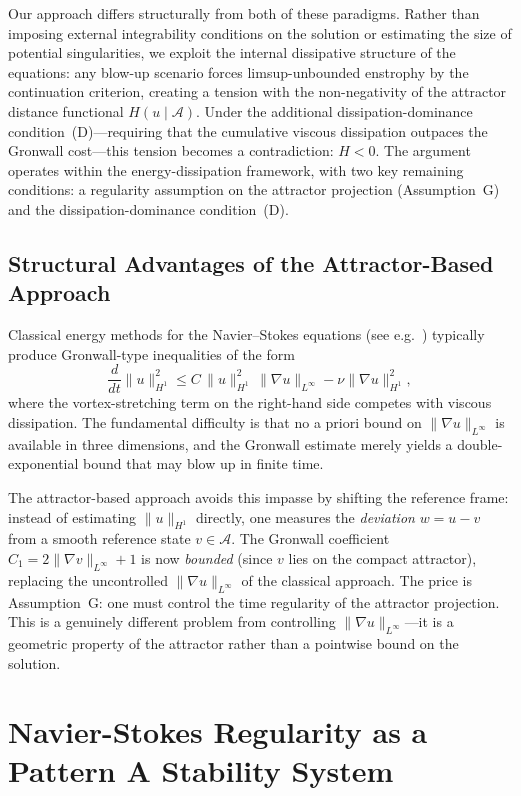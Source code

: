 \documentclass[12pt,a4paper]{article}
\theoremstyle{definition}
\theoremstyle{plain}
\theoremstyle{remark}
\begin{document}
Our approach differs structurally from both of these paradigms. Rather than imposing external integrability conditions on the solution or estimating the size of potential singularities, we exploit the internal dissipative structure of the equations: any blow-up scenario forces limsup-unbounded enstrophy by the continuation criterion, creating a tension with the non-negativity of the attractor distance functional $H(u \mid \mathcal{A})$. Under the additional dissipation-dominance condition~(D)---requiring that the cumulative viscous dissipation outpaces the Gronwall cost---this tension becomes a contradiction: $H < 0$. The argument operates within the energy-dissipation framework, with two key remaining conditions: a regularity assumption on the attractor projection (Assumption~G) and the dissipation-dominance condition~(D).

\subsection{Structural Advantages of the Attractor-Based Approach}

Classical energy methods for the Navier--Stokes equations (see e.g.\ \cite{ConstantinFoias1988,Temam2001}) typically produce Gronwall-type inequalities of the form
\[
    \frac{d}{dt}\|u\|_{H^1}^2 \le C\,\|u\|_{H^1}^2\,\|\nabla u\|_{L^\infty} - \nu\|\nabla u\|_{H^1}^2,
\]
where the vortex-stretching term on the right-hand side competes with viscous dissipation. The fundamental difficulty is that no a priori bound on $\|\nabla u\|_{L^\infty}$ is available in three dimensions, and the Gronwall estimate merely yields a double-exponential bound that may blow up in finite time.

The attractor-based approach avoids this impasse by shifting the reference frame: instead of estimating $\|u\|_{H^1}$ directly, one measures the \emph{deviation} $w = u - v$ from a smooth reference state $v \in \mathcal{A}$. The Gronwall coefficient $C_1 = 2\|\nabla v\|_{L^\infty} + 1$ is now \emph{bounded} (since $v$ lies on the compact attractor), replacing the uncontrolled $\|\nabla u\|_{L^\infty}$ of the classical approach. The price is Assumption~G: one must control the time regularity of the attractor projection. This is a genuinely different problem from controlling $\|\nabla u\|_{L^\infty}$---it is a geometric property of the attractor rather than a pointwise bound on the solution.

\section{Navier-Stokes Regularity as a Pattern A Stability System}
\end{document}
